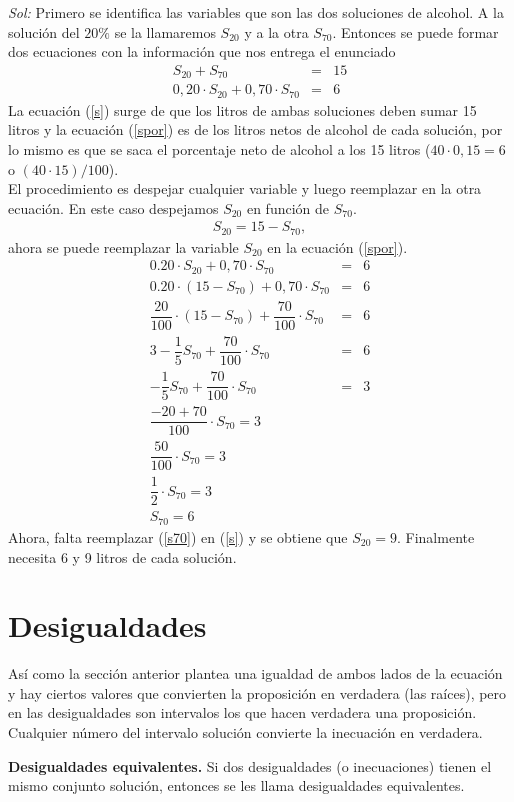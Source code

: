 \noindent\textit{Sol:} Primero se identifica las variables que son las dos soluciones de alcohol. A la solución del $20\%$ se la llamaremos $S_{20}$ y a la otra $S_{70}$. Entonces se puede formar dos ecuaciones con la información que nos entrega el enunciado 
\begin{eqnarray}
S_{20}+S_{70}&=&15 \label{s}\\
0,20\cdot S_{20}+0,70\cdot S_{70}&=&6\label{spor}
\end{eqnarray}
 La ecuación (\ref{s}) surge de que los litros de ambas soluciones deben sumar 15 litros y la ecuación (\ref{spor}) es de los litros netos de alcohol de cada solución, por lo mismo es que se saca el porcentaje neto de alcohol a los 15 litros ($40\cdot 0,15=6$ o $(40\cdot 15)/100$). \\
 El procedimiento es despejar cualquier variable y luego reemplazar en la otra ecuación. En este caso despejamos $S_{20}$ en función de $S_{70}$.
\begin{eqnarray*}
S_{20}=15-S_{70},
\end{eqnarray*}
ahora se puede reemplazar la variable $S_{20}$ en la ecuación (\ref{spor}).
\begin{eqnarray}
0.20\cdot S_{20}+0,70\cdot S_{70}&=&6\nonumber\\
0.20\cdot (15-S_{70})+0,70\cdot S_{70}&=&6\nonumber\\
\dfrac{20}{100}\cdot (15-S_{70})+\dfrac{70}{100}\cdot S_{70}&=&6\nonumber\\
3-\dfrac{1}{5} S_{70}+\dfrac{70}{100}\cdot S_{70}&=&6\nonumber\\
-\dfrac{1}{5} S_{70}+\dfrac{70}{100}\cdot S_{70}&=&3\nonumber\\
\dfrac{-20+70}{100}\cdot S_{70}=3\nonumber\\
\dfrac{50}{100}\cdot S_{70}=3\nonumber\\
\dfrac{1}{2}\cdot S_{70}=3\nonumber\\
S_{70}=6\label{s70}
\end{eqnarray}
Ahora, falta reemplazar (\ref{s70}) en (\ref{s}) y se obtiene que $S_{20}=9$. Finalmente necesita 6 y 9 litros de cada solución.

\section{Desigualdades}
Así como la sección anterior plantea una igualdad de ambos lados de la ecuación y hay ciertos valores que convierten la proposición en verdadera (las raíces), pero en las desigualdades son intervalos los que hacen verdadera una proposición. Cualquier número del intervalo solución convierte la inecuación en verdadera.\\
\begin{mydef}
\textbf{Desigualdades equivalentes.} Si dos desigualdades (o inecuaciones) tienen el mismo conjunto solución, entonces se les llama desigualdades equivalentes.\\
\end{mydef}


